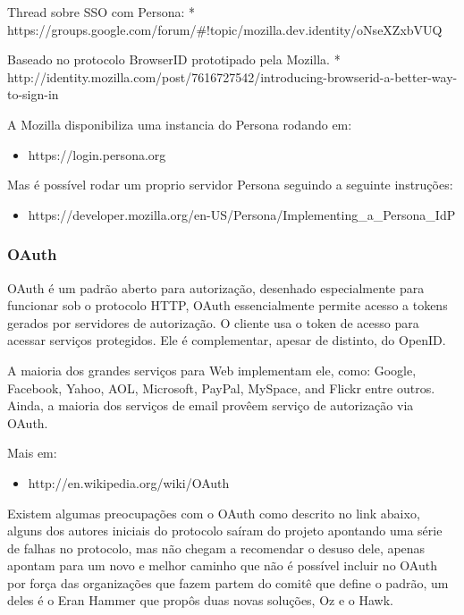 \documentclass[11pt]{article}
\begin{document}
Thread sobre SSO com Persona:
   * https://groups.google.com/forum/\#!topic/mozilla.dev.identity/oNseXZxbVUQ

Baseado no protocolo BrowserID prototipado pela Mozilla.
* http://identity.mozilla.com/post/7616727542/introducing-browserid-a-better-way-to-sign-in

A Mozilla disponibiliza uma instancia do Persona rodando em:

\begin{itemize}
  \item{https://login.persona.org}
\end{itemize}

Mas é possível rodar um proprio servidor Persona seguindo a seguinte
instruções:

\begin{itemize}
  \item{https://developer.mozilla.org/en-US/Persona/Implementing\_a\_Persona\_IdP}
\end{itemize}

\subsubsection{OAuth}

OAuth é um padrão aberto para autorização, desenhado especialmente para
funcionar sob o protocolo HTTP, OAuth essencialmente permite acesso a tokens
gerados por servidores de autorização. O cliente usa o token de acesso para
acessar serviços protegidos. Ele é complementar, apesar de distinto, do OpenID.

A maioria dos grandes serviços para Web implementam ele, como: Google,
Facebook, Yahoo, AOL, Microsoft, PayPal, MySpace, and Flickr entre outros.
Ainda, a maioria dos serviços de email provêem serviço de autorização via
OAuth.

Mais em:
\begin{itemize}
  \item{http://en.wikipedia.org/wiki/OAuth}
\end{itemize}

Existem algumas preocupações com o OAuth como descrito no link abaixo, alguns
dos autores iniciais do protocolo saíram do projeto apontando uma série de
falhas no protocolo, mas não chegam a recomendar o desuso dele, apenas apontam
para um novo e melhor caminho que não é possível incluir no OAuth por força
das organizações que fazem partem do comitê que define o padrão, um deles é o
Eran Hammer que propôs duas novas soluções, Oz e o Hawk.
\end{document}
